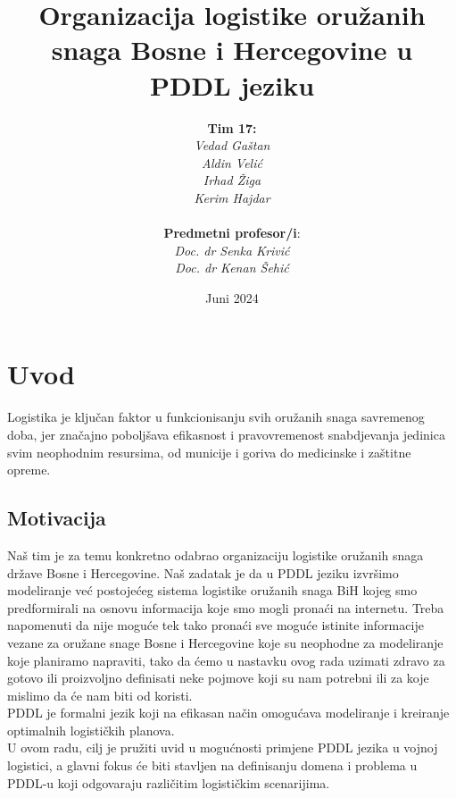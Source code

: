 \documentclass{article}
\begin{document}
\title{\textbf{Organizacija logistike oružanih snaga Bosne i Hercegovine u PDDL jeziku}}
\author{\textbf{Tim 17:}\\\textit{Vedad Gaštan}\\\textit{Aldin Velić}\\\textit{Irhad Žiga}\\\textit{Kerim Hajdar}\\\\\textbf{Predmetni profesor/i}:\\\textit{Doc. dr Senka Krivić}\\\textit{Doc. dr Kenan Šehić}}
\date{Juni 2024}

\maketitle
{}
\newpage
\tableofcontents
\newpage
\section{Uvod}
Logistika je ključan faktor u funkcionisanju svih oružanih snaga savremenog doba, jer značajno poboljšava efikasnost i pravovremenost snabdjevanja jedinica svim neophodnim resursima, od municije i goriva do medicinske i zaštitne opreme.


\subsection{Motivacija}
Naš tim je za temu konkretno odabrao organizaciju logistike oružanih snaga države Bosne i Hercegovine. Naš zadatak je da u PDDL jeziku izvršimo modeliranje već postojećeg sistema logistike oružanih snaga BiH kojeg smo predformirali na osnovu informacija koje smo mogli pronaći na internetu. Treba napomenuti da nije moguće tek tako pronaći sve moguće istinite informacije vezane za oružane snage Bosne i Hercegovine koje su neophodne za modeliranje koje planiramo napraviti, tako da ćemo u nastavku ovog rada uzimati zdravo za gotovo ili proizvoljno definisati neke pojmove koji su nam potrebni ili za koje mislimo da će nam biti od koristi.
\\PDDL je formalni jezik koji na efikasan način omogućava modeliranje i kreiranje optimalnih logističkih planova.
\\U ovom radu, cilj je pružiti uvid u mogućnosti primjene PDDL jezika u vojnoj logistici, a glavni fokus će biti stavljen na definisanju domena i problema u PDDL-u koji odgovaraju različitim logističkim scenarijima. 
\end{document}
